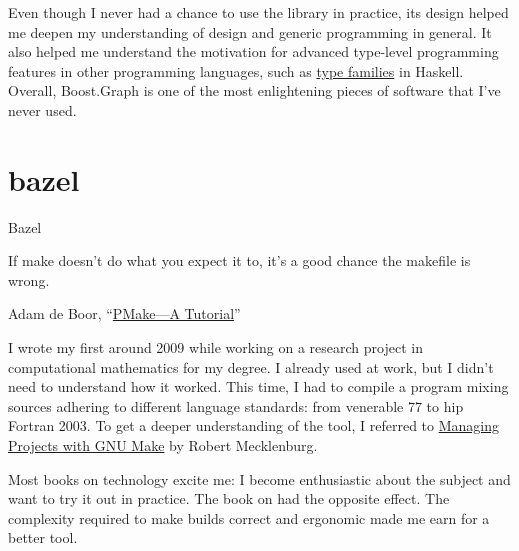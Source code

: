 \documentclass{article}
\begin{document}
Even though I never had a chance to use the library in practice, its design helped me deepen my understanding of \href{https://en.wikipedia.org/wiki/Standard_Template_Library}{} design and generic programming in general.
It also helped me understand the motivation for advanced type-level programming features in other programming languages, such as \href{https://wiki.haskell.org/GHC/Type_families}{type families} in Haskell.
Overall, Boost.Graph is one of the most enlightening pieces of software that I've never used.

\section{bazel}{Bazel}

\epigraph{
  If make doesn't do what you expect it to, it's a good chance the makefile is wrong.
}{
  Adam de Boor, ``\href{https://docs-archive.freebsd.org/44doc/psd/12.make/paper.pdf}{PMake---A Tutorial}''
}

I wrote my first  around 2009 while working on a research project in computational mathematics for my degree.
I already used \href{https://en.wikipedia.org/wiki/Make_(software)}{} at work, but I didn't need to understand how it worked.
This time, I had to compile a  program mixing sources adhering to different language standards: from venerable  77 to hip Fortran 2003.
To get a deeper understanding of the tool, I referred to \href{https://www.oreilly.com/library/view/managing-projects-with/0596006101/}{Managing Projects with GNU Make} by Robert Mecklenburg.

Most books on technology excite me: I become enthusiastic about the subject and want to try it out in practice. 
The book on  had the opposite effect.
The complexity required to make builds correct and ergonomic made me earn for a better tool.
\end{document}
